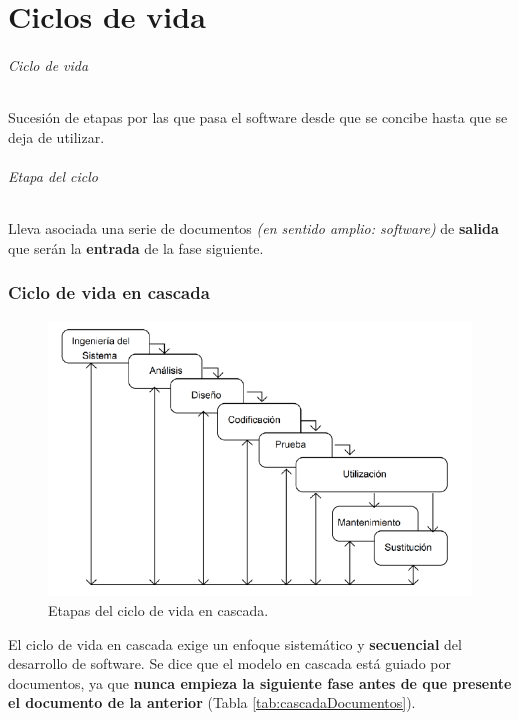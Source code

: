 \part{Ciclos de vida}
\paragraph{Ciclo de vida}  Sucesión de etapas por las que pasa el software desde que se concibe hasta que se deja de utilizar.
\paragraph{Etapa del ciclo} Lleva asociada una serie de documentos \textit{(en sentido amplio: software)} de \textbf{salida} que serán la \textbf{entrada} de la fase siguiente.
 \section{Ciclo de vida en cascada}
 \begin{figure}[H]
  \centering
  \includegraphics[width=0.7\linewidth]{Resources/cicloCascada}
  \caption{Etapas del ciclo de vida en cascada.}
  \label{fig:procesoCascada}
\end{figure}
 El ciclo de vida en cascada exige un enfoque sistemático y \textbf{secuencial} del desarrollo de software. Se dice que el modelo en cascada está guiado por documentos, ya que \textbf{nunca empieza la siguiente fase antes de que presente el documento de la anterior} (Tabla \ref{tab:cascadaDocumentos}).\\
 
